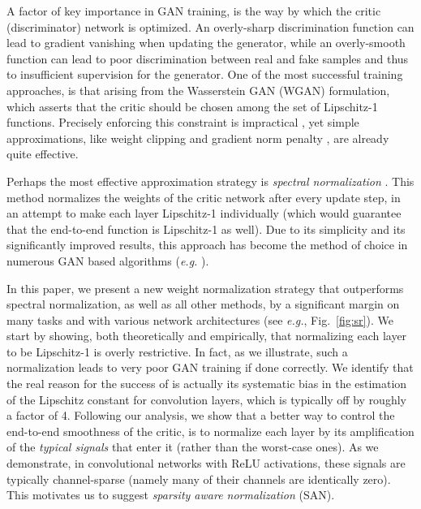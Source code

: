 \documentclass[letterpaper]{article} %
\begin{document}
A factor of key importance in GAN training, is the way by which the critic (discriminator) network is optimized. An overly-sharp discrimination function can lead to gradient vanishing when updating the generator, while an overly-smooth function can lead to poor discrimination between real and fake samples and thus to insufficient supervision for the generator. One of the most successful training approaches, is that arising from the Wasserstein GAN (WGAN) \cite{arjovsky2017wasserstein} formulation, which asserts that the critic should be chosen among the set of Lipschitz-1 functions. Precisely enforcing this constraint is impractical \cite{NIPS2018_7640}, yet simple approximations, like weight clipping \cite{arjovsky2017wasserstein} and gradient norm penalty  \cite{gulrajani2017improved}, are already quite effective.

Perhaps the most effective approximation strategy is \emph{spectral normalization} \cite{spectral}. This method normalizes the weights of the critic network after every update step, in an attempt to make each layer Lipschitz-1 individually (which would guarantee that the end-to-end function is Lipschitz-1 as well). Due to its simplicity and its significantly improved results, this approach has become the method of choice in numerous GAN based algorithms (\emph{e.g.} \cite{miyato2018cgans,spade,brock2018large,armanious2020medgan}).

In this paper, we present a new weight normalization strategy that outperforms spectral normalization, as well as all other methods, by a significant margin on many tasks and with various network architectures (see \emph{e.g.}, Fig.~\ref{fig:sr}). We start by showing, both theoretically and empirically, that normalizing each layer to be Lipschitz-1 is overly restrictive. In fact, as we illustrate, such a normalization leads to very poor GAN training if done correctly. We identify that the real reason for the success of \cite{spectral} is actually its systematic bias in the estimation of the Lipschitz constant for convolution layers, which is typically off by roughly a factor of 4. Following our analysis, we show that a better way to control the end-to-end smoothness of the critic, is to normalize each layer by its amplification of the \emph{typical signals} that enter it (rather than the worst-case ones). As we demonstrate, in convolutional networks with ReLU activations, these signals are typically channel-sparse (namely many of their channels are identically zero). This motivates us to suggest \emph{sparsity aware normalization} (SAN).
\end{document}
